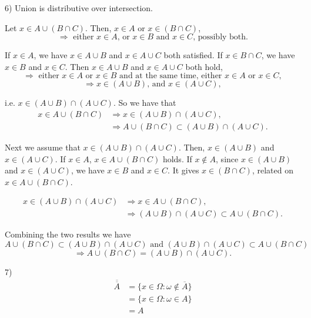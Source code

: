\documentclass[12pt,thmsa]{article}
\begin{document}
\medskip

6)  Union is distributive over intersection.

Let \(x \in A \cup(B \cap C) \). Then, \(x \in A\) or \(x \in(B \cap C)\), 
\[ \Rightarrow \text{ either }  x \in A \text{, or } x \in B \text{ and } x \in C \text{, possibly both}. \]

If \(x \in A\), we have \(x \in A \cup B \) and \(x \in A \cup C \) both satisfied. If \(x \in B \cap C\), we have \(x \in B \) and \(x \in C\). Then \(x \in A \cup B \) and \(x \in A \cup C \) both hold,
\[ \Rightarrow \text{ either }  x \in A \text{ or } x \in B \text{ and at the same time, either } x \in A \text{ or } x \in C, \]
\[\Rightarrow  x \in (A \cup B) \text{, and } x \in (A \cup C), \]
 
i.e. \(x \in(A \cup B) \cap(A \cup C)\). So we have that \[
\begin{aligned}
x \in A \cup(B \cap C) & \Rightarrow x \in(A \cup B) \cap(A \cup C), \\
&\Rightarrow A \cup(B \cap C) \subset(A \cup B) \cap(A \cup C).
\end{aligned}\]   

Next we assume that \(x \in(A \cup B) \cap(A \cup C) \). Then, \(x \in(A \cup B)\) and \(x \in(A \cup C)\). If \(x \in A\), \(x \in A \cup (B \cap C)\) holds. If \(x \notin A\), since \(x \in(A \cup B) \) and \(x \in(A \cup C) \), we have \(x \in B\) and \(x \in C\). It gives \(x \in(B \cap C)\), related on \(x \in A \cup (B \cap C)\).

\[\begin{aligned}
x \in(A \cup B) \cap(A \cup C) &\Rightarrow x \in A \cup(B \cap C),\\
&\Rightarrow (A \cup B) \cap(A \cup C) \subset A \cup(B \cap C).
\end{aligned}\]    

Combining the two results we have
\[A \cup(B \cap C) \subset(A \cup B) \cap(A \cup C) \text{ and } (A \cup B) \cap(A \cup C) \subset A \cup(B \cap C) \]
\[\Rightarrow A \cup(B \cap C)=(A \cup B) \cap(A \cup C).\]

\medskip

7)
\[\begin{aligned}
\overline{\overline{A}} &=\{ x \in \Omega: \omega \notin  \overline{A}\} \\
& = \{ x \in \Omega: \omega \in A\} \\
& = A
\end{aligned}
\]

\medskip
\end{document}
